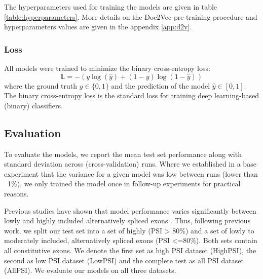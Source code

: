 The hyperparameters used for training the models are given in table \ref{table:hyperparameters}. More details on the Doc2Vec pre-training procedure and hyperparameters values are given in the appendix \ref{app:d2v}.

\subsubsection{Loss}  \label{subsubsec:loss}
All models were trained to minimize the binary cross-entropy loss:
$$\mathbb{L} = - (y \log(\hat{y}) + (1 - y) \log (1 - \hat{y}))$$
where the ground truth $y \in \{0, 1\}$ and the prediction of the model $\hat{y} \in [0, 1]$. The binary cross-entropy loss is the standard loss for training deep learning-based (binary) classifiers.

\subsection{Evaluation}

To evaluate the models, we report the mean test set performance along with standard deviation across (cross-validation) runs. 
Where we established in a base experiment that the variance for a given model was low between runs (lower than ~1\%), we only trained the model once in follow-up experiments for practical reasons.

Previous studies have shown that model performance varies significantly between lowly and highly included alternatively spliced exons \cite{dsc} \cite{buschhertel}. Thus, following previous work, we split our test set into a set of highly (PSI > 80\%) and a set of lowly to moderately included, alternatively spliced exons (PSI <=80\%). Both sets contain all constitutive exons. We denote the first set as high PSI dataset (HighPSI), the second as low PSI dataset (LowPSI) and the complete test as all PSI dataset (AllPSI). We evaluate our models on all three datasets.


